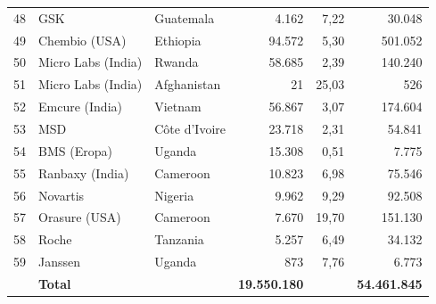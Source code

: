 \begin{longtable}{rllrrr}
48 & GSK & Guatemala & 4.162 & 7,22 & 30.048 \\
49 & Chembio (USA) & Ethiopia & 94.572 & 5,30 & 501.052 \\
50 & Micro Labs (India) & Rwanda & 58.685 & 2,39 & 140.240 \\
51 & Micro Labs (India) & Afghanistan & 21 & 25,03 & 526 \\
52 & Emcure (India) & Vietnam & 56.867 & 3,07 & 174.604 \\
53 & MSD & Côte d'Ivoire & 23.718 & 2,31 & 54.841 \\
54 & BMS (Eropa) & Uganda & 15.308 & 0,51 & 7.775 \\
55 & Ranbaxy (India) & Cameroon & 10.823 & 6,98 & 75.546 \\
56 & Novartis & Nigeria & 9.962 & 9,29 & 92.508 \\
57 & Orasure (USA) & Cameroon & 7.670 & 19,70 & 151.130 \\
58 & Roche & Tanzania & 5.257 & 6,49 & 34.132 \\
59 & Janssen & Uganda & 873 & 7,76 & 6.773 \\
\midrule & \multicolumn{2}{l}{\textbf{Total}} & \textbf{19.550.180} & & \textbf{54.461.845} \\ \bottomrule\end{longtable}
